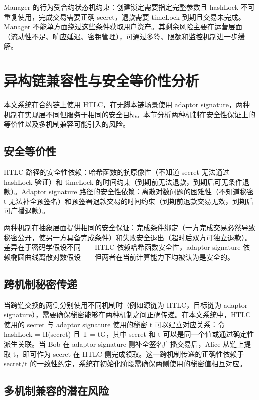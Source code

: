 Manager 的行为受合约状态机约束：创建锁定需要指定完整参数且 hashLock 不可重复使用，完成交易需要正确 secret，退款需要 timeLock 到期且交易未完成。Manager 不能单方面绕过这些条件获取用户资产。其剩余风险主要在运营层面（流动性不足、响应延迟、密钥管理），可通过多签、限额和监控机制进一步缓解。


\section{异构链兼容性与安全等价性分析}


本文系统在合约链上使用 HTLC，在无脚本链场景使用 adaptor signature，两种机制在实现层不同但服务于相同的安全目标。本节分析两种机制在安全性保证上的等价性以及多机制兼容可能引入的风险。


\subsection{安全等价性}


HTLC 路径的安全性依赖：哈希函数的抗原像性（不知道 secret 无法通过 hashLock 验证）和 timeLock 的时间约束（到期前无法退款，到期后可无条件退款）。Adaptor signature 路径的安全性依赖：离散对数问题的困难性（不知道秘密 t 无法补全预签名）和预签署退款交易的时间约束（到期前退款交易无效，到期后可广播退款）。


两种机制在抽象层面提供相同的安全保证：完成条件绑定（一方完成交易必然导致秘密公开，使另一方具备完成条件）和失败安全退出（超时后双方可独立退款）。差异在于密码学假设不同——HTLC 依赖哈希函数安全性，adaptor signature 依赖椭圆曲线离散对数假设——但两者在当前计算能力下均被认为是安全的。


\subsection{跨机制秘密传递}


当跨链交换的两侧分别使用不同机制时（例如源链为 HTLC，目标链为 adaptor signature），需要确保秘密能够在两种机制之间正确传递。在本文系统中，HTLC 使用的 secret 与 adaptor signature 使用的秘密 t 可以建立对应关系：令 hashLock = H(secret) 且 T = tG，其中 secret 和 t 可以是同一个值或通过确定性派生关联。当 Bob 在 adaptor signature 侧补全签名广播交易后，Alice 从链上提取 t，即可作为 secret 在 HTLC 侧完成领取。这一跨机制传递的正确性依赖于 secret/t 的一致性约定，系统在初始化阶段需确保两侧使用的秘密值相互对应。


\subsection{多机制兼容的潜在风险}


